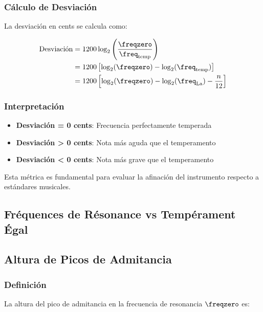 \subsubsection{Cálculo de Desviación}

La desviación en cents se calcula como:

\begin{align}
\text{Desviación} &= 1200 \log_2\left(\frac{\freqzero}{\freq_{\text{temp}}}\right) \\
&= 1200 \left[\log_2(\freqzero) - \log_2(\freq_{\text{temp}})\right] \\
&= 1200 \left[\log_2(\freqzero) - \log_2(\freq_{\text{La}}) - \frac{n}{12}\right]
\end{align}

\subsubsection{Interpretación}

\begin{itemize}
    \item \textbf{Desviación = 0 cents}: Frecuencia perfectamente temperada
    \item \textbf{Desviación > 0 cents}: Nota más aguda que el temperamento
    \item \textbf{Desviación < 0 cents}: Nota más grave que el temperamento
\end{itemize}

Esta métrica es fundamental para evaluar la afinación del instrumento respecto a estándares musicales.

\subsection{Fréquences de Résonance vs Tempérament Égal}


\subsection{Altura de Picos de Admitancia}

\subsubsection{Definición}

La altura del pico de admitancia en la frecuencia de resonancia $\freqzero$ es:

